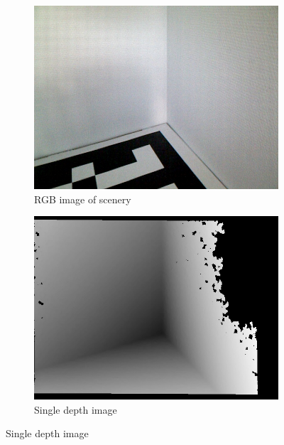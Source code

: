 \begin{figure}[htbp]
        \centering
        \begin{subfigure}[b]{0.31\textwidth}
                \includegraphics[width=\textwidth]{images/software/gt/RGBImage.jpg}
                \caption{RGB image of scenery}
                \label{img:rgbGT}
        \end{subfigure}
        \hfill
        \begin{subfigure}[b]{0.31\textwidth}
                \includegraphics[width=\textwidth]{images/software/gt/actualImage.jpg}
                \caption{Single depth image}
                \label{img:depthGTSingle}
        \end{subfigure}
         \hfill

\end{figure}
